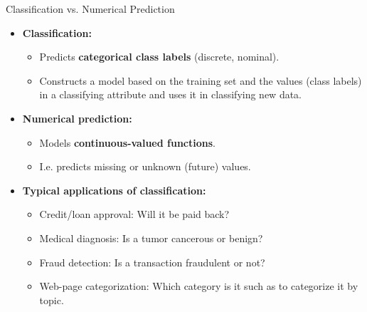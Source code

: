 \begin{frame}{Classification vs. Numerical Prediction}
	\begin{itemize}
		\item \textbf{Classification:}
		      \begin{itemize}
			      \item Predicts \textbf{\color{airforceblue}categorical class labels} (discrete, nominal).
			      \item Constructs a model based on the training set and the values (class labels) in a classifying attribute and uses it in classifying new data.
		      \end{itemize}
		\item \textbf{Numerical prediction:}
		      \begin{itemize}
			      \item Models \textbf{\color{airforceblue}continuous-valued functions}.
			      \item I.e. predicts missing or unknown (future) values.
		      \end{itemize}
		\item \textbf{Typical applications of classification:}
		      \begin{itemize}
			      \item Credit/loan approval: Will it be paid back?
			      \item Medical diagnosis: Is a tumor cancerous or benign?
			      \item Fraud detection: Is a transaction fraudulent or not?
			      \item Web-page categorization: Which category is it such as to categorize it by topic.
		      \end{itemize}
	\end{itemize}
\end{frame}

